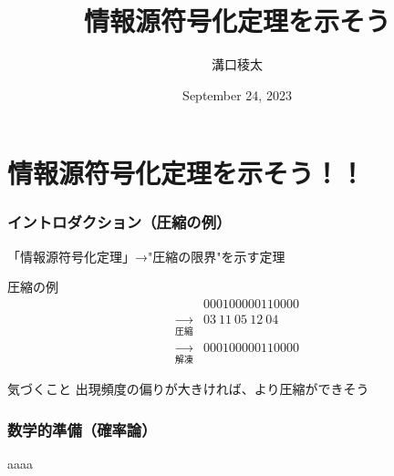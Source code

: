 \documentclass{classes/myslide}
\title{情報源符号化定理を示そう}
\author{溝口稜太}
\institute{創域理工学部情報計算科学科４年}
\date{September 24, 2023}
\begin{document}
\section{情報源符号化定理を示そう！！}

\begin{frame}
  \titlepage
\end{frame}

\begin{frame}\frametitle{イントロダクション（圧縮の例）}

  「情報源符号化定理」→"圧縮の限界"を示す定理

  \begin{exampleblock}{圧縮の例}
    \begin{align*}
      &000100000110000 \\
      \xrightarrow[圧縮]{} & 03 \ 11 \ 05 \ 12 \ 04 \\
      \xrightarrow[解凍]{} & 000100000110000 
    \end{align*}
  \end{exampleblock}

  \begin{alertblock}{気づくこと}
    出現頻度の偏りが大きければ、より圧縮ができそう
  \end{alertblock}

\end{frame}

\begin{frame}\frametitle{数学的準備（確率論）}
  aaaa
\end{frame}
\end{document}
